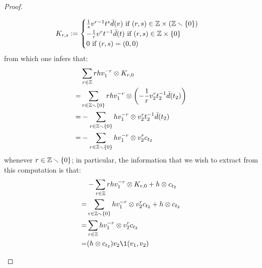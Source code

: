 \begin{proof}
\begin{enumerate}
                            $$
                                K_{r, s} :=
                                \begin{cases}
                                    \text{$\frac1s v^{r - 1} t^s \bar{d}(v)$ if $(r, s) \in \Z \x (\Z \setminus \{0\})$}
                                    \\
                                    \text{$-\frac1r v^r t^{-1} \bar{d}(t)$ if $(r, s) \in \Z \x \{0\}$}
                                    \\
                                    \text{$0$ if $(r, s) = (0, 0)$}
                                \end{cases}
                            $$
                        from which one infers that:
                            $$
                                \begin{aligned}
                                    & \sum_{r \in \Z} r h v_1^{-r} \tensor K_{r, 0}
                                    \\
                                    = & \sum_{r \in \Z \setminus \{0\}} r h v_1^{-r} \tensor \left( -\frac1r v_2^r t_2^{-1} \bar{d}(t_2) \right)
                                    \\
                                    = & -\sum_{r \in \Z \setminus \{0\}} h v_1^{-r} \tensor v_2^r t_2^{-1} \bar{d}(t_2)
                                    \\
                                    = & -\sum_{r \in \Z \setminus \{0\}} h v_1^{-r} \tensor v_2^r c_{t_2}
                                \end{aligned}
                            $$
                        whenever $r \in \Z \setminus \{0\}$; in particular, the information that we wish to extract from this computation is that:
                            $$
                                \begin{aligned}
                                    & -\sum_{r \in \Z} r h v_1^{-r} \tensor K_{r, 0} + h \tensor c_{t_2}
                                    \\
                                    = & \sum_{r \in \Z \setminus \{0\}} h v_1^{-r} \tensor v_2^r c_{t_2} + h \tensor c_{t_2}
                                    \\
                                    = & \sum_{r \in \Z} h v_1^{-r} \tensor v_2^r c_{t_2}
                                    \\
                                    = & (h \tensor c_{t_2}) v_2 \1(v_1, v_2)

\end{aligned}$$
\end{enumerate}
\end{proof}
